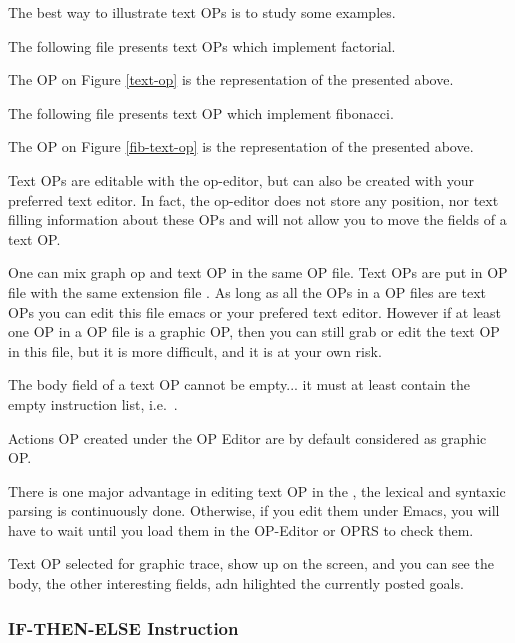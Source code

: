 The best way to illustrate text OPs is to study some examples.

The following file presents text OPs which implement factorial.



The OP on Figure \ref{text-op} is the \OPE{} representation of the  presented above.

The following file presents text OP which implement fibonacci.


The OP on Figure \ref{fib-text-op} is the \OPE{} representation of the
 presented above.

Text OPs  are editable with the op-editor, but can also be created with your
preferred text editor. In fact, the op-editor does not store any position, nor
text filling information about these OPs and will not allow you to move the
fields of a text OP. 

One can mix graph op and text OP in the same OP file. Text OPs are put in OP
file with  the same extension file . As long as all the OPs in a OP
files are text OPs you can edit this file emacs or your prefered text editor.
However if  at least one OP in a OP file is a graphic OP, then you can  still
grab or edit the text OP in this file, but it is more difficult, and it is at
your own risk.

The body field of a text OP cannot be empty... it must at least contain the
empty instruction list, i.e.\ \code{()}.

Actions OP created under the OP Editor are by default considered as graphic OP.

There is one major advantage in editing text OP in the \OPE{}, the lexical and
syntaxic parsing is continuously done.  Otherwise, if you edit them under
Emacs, you will have to wait until you load them in the OP-Editor or OPRS to
check them.

Text OP selected for graphic trace, show up on the screen, and you can see the
body, the other interesting fields, adn hilighted the currently posted goals.

\subsubsection{IF-THEN-ELSE Instruction}

